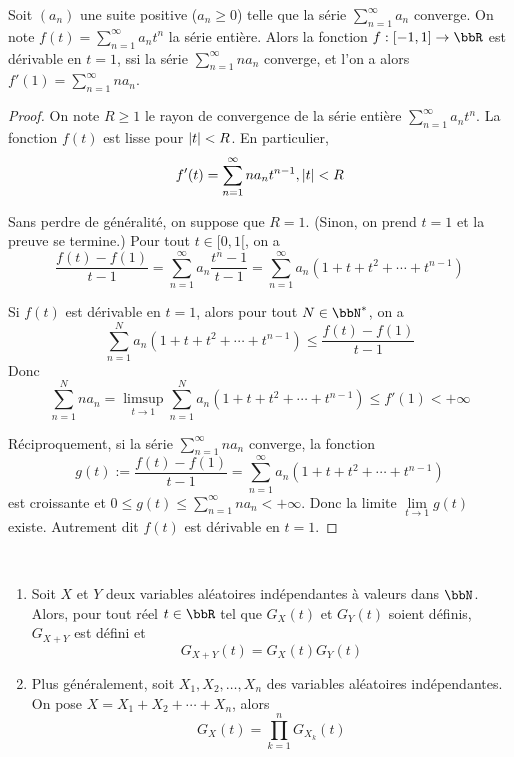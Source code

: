 \begin{lem}
    Soit $(a_n)$ une suite positive ($a_n \geqslant 0$) telle que la série $\sum\limits_{n = 1}^\infty a_n$ converge.
    On note $f(t) = \sum\limits_{n = 1}^\infty a_nt^n$ la série entière.
    Alors la fonction $f: [-1, 1] \to \bbR$ est dérivable en $t = 1$,
    ssi la série $\sum\limits_{n = 1}^\infty na_n$ converge,
    et l'on a alors $f'(1) = \sum\limits_{n = 1}^\infty na_n$.
\end{lem}

\begin{proof}
    On note $R \geqslant 1$ le rayon de convergence de la série entière $\sum\limits_{n = 1}^\infty a_nt^n$.
    La fonction $f(t)$ est lisse pour $\left\lvert t \right\rvert < R$.
    En particulier,
    \[ f'(t) = \sum_{n = 1}^\infty na_n t^{n-1}, \left\lvert t \right\rvert < R \]

    Sans perdre de généralité, on suppose que $R = 1$. (Sinon, on prend $t = 1$ et la preuve se termine.)
    Pour tout $t \in [0, 1[$, on a
    \[ \frac{f(t) - f(1)}{t - 1} = \sum_{n = 1}^\infty a_n \frac{t^n - 1}{t - 1}
        = \sum_{n = 1}^\infty a_n(1 + t + t^2 + \cdots + t^{n-1}) \]

    Si $f(t)$ est dérivable en $t = 1$, alors pour tout $N \in \bbN^*$, on a
    \[ \sum_{n = 1}^N a_n(1 + t + t^2 + \cdots + t^{n-1}) \leqslant \frac{f(t) - f(1)}{t - 1} \]
    Donc
    \[ \sum_{n = 1}^N na_n = \limsup_{t \to 1} \sum_{n = 1}^N a_n(1 + t + t^2 + \cdots + t^{n-1})
        \leqslant f'(1) < +\infty \]

    Réciproquement, si la série $\sum\limits_{n = 1}^\infty na_n$ converge, la fonction
    \[ g(t) := \frac{f(t) - f(1)}{t - 1} = \sum_{n = 1}^\infty a_n(1 + t + t^2 + \cdots + t^{n-1}) \]
    est croissante et $0 \leqslant g(t) \leqslant \sum\limits_{n = 1}^\infty na_n < +\infty$.
    Donc la limite $\lim\limits_{t \to 1} g(t)$ existe.
    Autrement dit $f(t)$ est dérivable en $t = 1$.
\end{proof}

\begin{prop} $\ $
    \begin{enumerate}
        \item Soit $X$ et $Y$ deux variables aléatoires indépendantes à valeurs dans $\bbN$.
              Alors, pour tout réel $t \in \bbR$ tel que $G_X(t)$ et $G_Y(t)$ soient définis,
              $G_{X+Y}$ est défini et
              \[ G_{X+Y}(t) = G_X(t)G_Y(t) \]
        \item Plus généralement, soit $X_1, X_2, \ldots, X_n$ des variables aléatoires indépendantes.
              On pose $X = X_1 + X_2 + \cdots + X_n$, alors
              \[ G_X(t) = \prod_{k = 1}^n G_{X_k}(t) \]
    \end{enumerate}
\end{prop}

